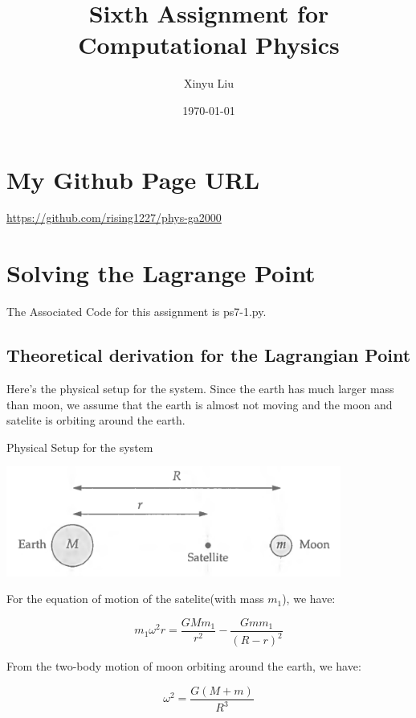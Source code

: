 \documentclass[letterpaper,12pt]{article}
\title{Sixth Assignment for Computational Physics}
\date{\today}
\author{Xinyu Liu}
\begin{document}
\maketitle
\tableofcontents

\newpage

\section{My Github Page URL}
\url{https://github.com/rising1227/phys-ga2000}

\section{Solving the Lagrange Point}

The Associated Code for this assignment is ps7-1.py.

\subsection{Theoretical derivation for the Lagrangian Point}

Here's the physical setup for the system. Since the earth has much larger mass than moon, we assume that the earth is almost not moving and the moon and satelite is orbiting around the earth.

\begin{table}[!h]
    \centering
    \caption{Physical Setup for the system}
    \includegraphics[width=11cm]{ps7.11.png}
\end{table}%

For the equation of motion of the satelite(with mass $m_1$), we have:

\begin{equation}
    m_1 \omega^2 r = \frac{GMm_1}{r^2} - \frac{Gmm_1}{(R-r)^2}
\end{equation}

From the two-body motion of moon orbiting around the earth, we have:

\begin{equation}
    \omega^2 = \frac{G(M+m)}{R^3}
\end{equation}
\end{document}
